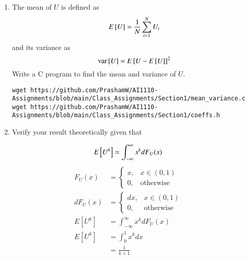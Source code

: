 \documentclass[journal,12pt,twocolumn]{IEEEtran}
\renewcommand\thesection{\arabic{section}}
\begin{document}
\begin{enumerate}[label=\thesection.\arabic*
,ref=\thesection.\theenumi]
\begin{align}
           &= 0
\end{align}
If $0 <x <1$,
\begin{align}
    F_U(x) &= \int_{0}^{x} f_{U}\brak{x} \,dx  \\
    F_U(x) &= \int_{0}^{x} 1 \,dx  \\
           &= x
\end{align}
If $x \geq 1$,
\begin{align}
    F_U(x) &= \int_{1}^{x} f_{U}\brak{x} \,dx  \\
    F_U(x) &= \int_{1}^{x} 0 \,dx  \\
           &= 0
\end{align}
\item
The mean of $U$ is defined as
%
\begin{equation}
E{}\left[U\right] = \frac{1}{N}\sum_{i=1}^{N}U_i
\end{equation}
%
and its variance as
%
\begin{equation}
\text{var}{}\left[U\right] = E{}\left[U- E{}\left[U\right]\right]^2 
\end{equation}
Write a C program to  find the mean and variance of $U$. \\
\solution
\begin{lstlisting}
wget https://github.com/PrashamW/AI1110-Assignments/blob/main/Class_Assignments/Section1/mean_variance.c
wget https://github.com/PrashamW/AI1110-Assignments/blob/main/Class_Assignments/Section1/coeffs.h
\end{lstlisting}

\item Verify your result theoretically given that
\end{enumerate}
%
\begin{equation}
E{}\left[U^k\right] = \int_{-\infty}^{\infty}x^kdF_{U}(x)
\end{equation}\solution
\begin{align}  
F_U(x) &= \begin{cases}
x, & x\in (0,1) \\
0, & \text{otherwise}
\end{cases}
\\dF_U(x) &= \begin{cases}
dx, & x\in (0,1) \\
0, & \text{otherwise}
\end{cases}\\
E[U^{k}] &= \int_{-\infty}^{\infty} x^{k}dF_U(x)\\
E[U^{k}] &= \int_{0}^{1} x^{k}dx \\
&= \frac{1}{k+1}
\end{align}
\end{document}
